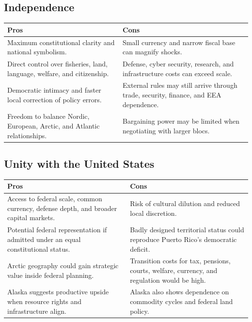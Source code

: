 \documentclass[11pt,a4paper]{article}
\begin{document}
\subsection{Independence}
\begin{center}
\begin{tabular}{p{}p{}}
\toprule
\textbf{Pros} & \textbf{Cons} \\
\midrule
Maximum constitutional clarity and national symbolism. & Small currency and narrow fiscal base can magnify shocks. \\
Direct control over fisheries, land, language, welfare, and citizenship. & Defense, cyber security, research, and infrastructure costs can exceed scale. \\
Democratic intimacy and faster local correction of policy errors. & External rules may still arrive through trade, security, finance, and EEA dependence. \\
Freedom to balance Nordic, European, Arctic, and Atlantic relationships. & Bargaining power may be limited when negotiating with larger blocs. \\
\bottomrule
\end{tabular}
\end{center}

\subsection{Unity with the United States}
\begin{center}
\begin{tabular}{p{}p{}}
\toprule
\textbf{Pros} & \textbf{Cons} \\
\midrule
Access to federal scale, common currency, defense depth, and broader capital markets. & Risk of cultural dilution and reduced local discretion. \\
Potential federal representation if admitted under an equal constitutional status. & Badly designed territorial status could reproduce Puerto Rico's democratic deficit. \\
Arctic geography could gain strategic value inside federal planning. & Transition costs for tax, pensions, courts, welfare, currency, and regulation would be high. \\
Alaska suggests productive upside when resource rights and infrastructure align. & Alaska also shows dependence on commodity cycles and federal land policy. \\
\bottomrule
\end{tabular}
\end{center}
\end{document}

